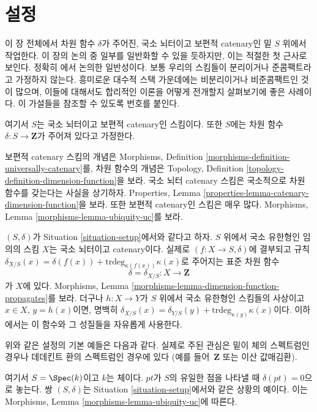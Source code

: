 \section{설정}
\label{section-setup}

\noindent
이 장 전체에서 차원 함수 $\delta$가 주어진, 국소 뇌터이고 보편적
catenary인 밑 $S$ 위에서 작업한다. 이 장의 논의 중 일부를 일반화할
수 있을 듯하지만, 이는 적절한 첫 근사로 보인다. 정확히
\cite{Thorup}에서 논의한 일반성이다. 보통 우리의 스킴들이 분리이거나
준콤팩트라고 가정하지 않는다. 흥미로운 대수적 스택 가운데에는
비분리이거나 비준콤팩트인 것이 많으며, 이들에 대해서도 합리적인
이론을 어떻게 전개할지 살펴보기에 좋은 사례이다. 이 가설들을
참조할 수 있도록 번호를 붙인다.

\begin{situation}
\label{situation-setup}
여기서 $S$는 국소 뇌터이고 보편적 catenary인 스킴이다. 또한 $S$에는
차원 함수
$\delta : S \longrightarrow \mathbf{Z}$가 주어져 있다고 가정한다.
\end{situation}

\noindent
보편적 catenary 스킴의 개념은 Morphisms, Definition
\ref{morphisms-definition-universally-catenary}를, 차원 함수의 개념은
Topology, Definition \ref{topology-definition-dimension-function}을 보라.
국소 뇌터 catenary 스킴은 국소적으로 차원 함수를 갖는다는 사실을
상기하자. Properties, Lemma
\ref{properties-lemma-catenary-dimension-function}을 보라. 또한 보편적
catenary인 스킴은 매우 많다. Morphisms, Lemma
\ref{morphisms-lemma-ubiquity-uc}를 보라.

\medskip\noindent
$(S, \delta)$가 Situation \ref{situation-setup}에서와 같다고 하자.
$S$ 위에서 국소 유한형인 임의의 스킴 $X$는 국소 뇌터이고
catenary이다. 실제로 $(f : X \to S, \delta)$에 결부되고 규칙
$\delta_{X/S}(x) = \delta(f(x)) + \text{trdeg}_{\kappa(f(x))}\kappa(x)$로
주어지는 표준 차원 함수
$$
\delta = \delta_{X/S} : X \longrightarrow \mathbf{Z}
$$
가 $X$에 있다. Morphisms, Lemma
\ref{morphisms-lemma-dimension-function-propagates}를 보라. 더구나
$h : X \to Y$가 $S$ 위에서 국소 유한형인 스킴들의 사상이고
$x \in X$, $y = h(x)$이면, 명백히
$\delta_{X/S}(x) = \delta_{Y/S}(y) + \text{trdeg}_{\kappa(y)}\kappa(x)$이다.
이하에서는 이 함수와 그 성질들을 자유롭게 사용한다.

\medskip\noindent
위와 같은 설정의 기본 예들은 다음과 같다. 실제로 주된 관심은 밑이
체의 스펙트럼인 경우나 데데킨트 환의 스펙트럼인 경우에 있다
(예를 들어\ $\mathbf{Z}$ 또는 이산 값매김환).

\begin{example}
\label{example-field}
여기서 $S = \Spec(k)$이고 $k$는 체이다. $pt$가 $S$의 유일한 점을
나타낼 때 $\delta(pt) = 0$으로 놓는다. 쌍 $(S, \delta)$는 Situation
\ref{situation-setup}에서와 같은 상황의 예이다. 이는 Morphisms, Lemma
\ref{morphisms-lemma-ubiquity-uc}에 따른다.
\end{example}

